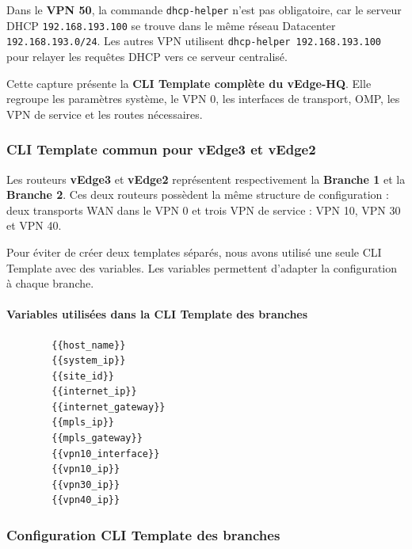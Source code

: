 \documentclass[12pt,a4paper,oneside]{report}
\begin{document}
	Dans le \textbf{VPN 50}, la commande \texttt{dhcp-helper} n'est pas obligatoire, car le serveur DHCP \texttt{192.168.193.100} se trouve dans le même réseau Datacenter \texttt{192.168.193.0/24}. 
	Les autres VPN utilisent \texttt{dhcp-helper 192.168.193.100} pour relayer les requêtes DHCP vers ce serveur centralisé.
	
	Cette capture présente la \textbf{CLI Template complète du vEdge-HQ}. 
	Elle regroupe les paramètres système, le VPN 0, les interfaces de transport, OMP, les VPN de service et les routes nécessaires.
	
	
	\subsubsection{CLI Template commun pour vEdge3 et vEdge2}
	
	Les routeurs \textbf{vEdge3} et \textbf{vEdge2} représentent respectivement la \textbf{Branche 1} et la \textbf{Branche 2}. 
	Ces deux routeurs possèdent la même structure de configuration : deux transports WAN dans le VPN 0 et trois VPN de service : VPN 10, VPN 30 et VPN 40.
	
	Pour éviter de créer deux templates séparés, nous avons utilisé une seule CLI Template avec des variables. 
	Les variables permettent d'adapter la configuration à chaque branche.
	
	\paragraph{Variables utilisées dans la CLI Template des branches}
	\begin{lstlisting}
		{{host_name}}
		{{system_ip}}
		{{site_id}}
		{{internet_ip}}
		{{internet_gateway}}
		{{mpls_ip}}
		{{mpls_gateway}}
		{{vpn10_interface}}
		{{vpn10_ip}}
		{{vpn30_ip}}
		{{vpn40_ip}}
	\end{lstlisting}
	\subsubsection{Configuration CLI Template des branches}
	
\end{document}

